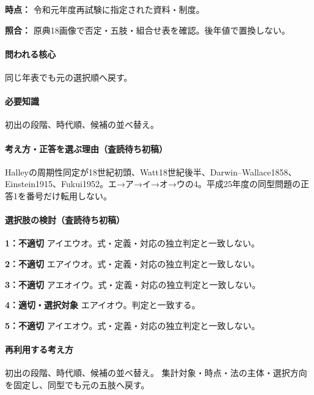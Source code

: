 \noindent\textbf{時点：} 令和元年度再試験に指定された資料・制度。\par

\noindent\textbf{照合：} 原典18画像で否定・五肢・組合せ表を確認。後年値で置換しない。\par

\paragraph{問われる核心} 同じ年表でも元の選択順へ戻す。

\paragraph{必要知識} 初出の段階、時代順、候補の並べ替え。

\paragraph{考え方・正答を選ぶ理由（査読待ち初稿）} Halleyの周期性同定が18世紀初頭、Watt18世紀後半、Darwin–Wallace1858、Einstein1915、Fukui1952。エ→ア→イ→オ→ウの4。平成25年度の同型問題の正答1を番号だけ転用しない。

\paragraph{選択肢の検討（査読待ち初稿）}\mbox{}\par

\noindent\textbf{1：不適切} アイエウオ。式・定義・対応の独立判定と一致しない。\par

\noindent\textbf{2：不適切} エアイウオ。式・定義・対応の独立判定と一致しない。\par

\noindent\textbf{3：不適切} アエオイウ。式・定義・対応の独立判定と一致しない。\par

\noindent\textbf{4：適切・選択対象} エアイオウ。判定と一致する。\par

\noindent\textbf{5：不適切} アイエオウ。式・定義・対応の独立判定と一致しない。\par

\paragraph{再利用する考え方} 初出の段階、時代順、候補の並べ替え。 集計対象・時点・法の主体・選択方向を固定し、同型でも元の五肢へ戻す。

